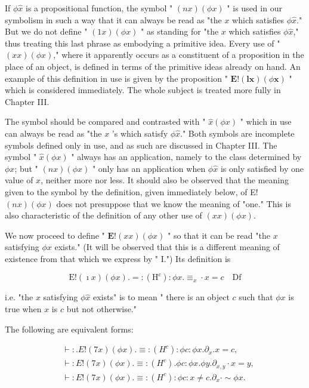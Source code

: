 \documentclass[10pt]{article}
\begin{document}
If $\phi \hat{x}$ is a propositional function, the symbol " $(n x)(\phi x)$ " is used in our symbolism in such a way that it can always be read as "the $x$ which satisfies $\phi \hat{x}$." But we do not define " $(1 x)(\phi x)$ " as standing for "the $x$ which satisfies $\phi \hat{x}$," thus treating this last phrase as embodying a primitive idea. Every use of " $(x x)(\phi x)$," where it apparently occurs as a constituent of a proposition in the place of an object, is defined in terms of the primitive ideas already on hand. An example of this definition in use is given by the proposition " $\mathbf{E}!(\boldsymbol{l} \boldsymbol{x})(\phi \boldsymbol{x})$ " which is considered immediately. The whole subject is treated more fully in Chapter III.

The symbol should be compared and contrasted with " $\hat{x}(\phi x)$ " which in use can always be read as "the $x$ 's which satisfy $\phi \hat{x}$." Both symbols are incomplete symbols defined only in use, and as such are discussed in Chapter III. The symbol " $\hat{x}(\phi x)$ " always has an application, namely to the class determined by $\phi x$; but " $(n x)(\phi x)$ " only has an application when $\phi \hat{x}$ is only satisfied by one value of $x$, neither more nor less. It should also be observed that the meaning given to the symbol by the definition, given immediately below, of E! $(n x)(\phi x)$ does not presuppose that we know the meaning of "one." This is also characteristic of the definition of any other use of $(x x)(\phi x)$.

We now proceed to define " $\mathbf{E}!(x x)(\phi x)$ " so that it can be read "the $x$ satisfying $\phi x$ exists." (It will be observed that this is a different meaning of existence from that which we express by " I.") Its definition is

$$
\mathrm{E}!(\imath x)(\phi x) .=:\left(\mathrm{H}^{c}\right): \phi x . \equiv_{x} \cdot x=c \quad \mathrm{Df}
$$

i.e. "the $x$ satisfying $\phi \hat{x}$ exists" is to mean " there is an object $c$ such that $\phi x$ is true when $x$ is $c$ but not otherwise."

The following are equivalent forms:

$$
\begin{aligned}
& \vdash: . E!(7 x)(\phi x) . \equiv:\left(H^{c}\right): \phi c: \phi x . \partial_{x} . x=c, \\
& \vdash: E!(7 x)(\phi x) . \equiv:\left(H^{c}\right) . \phi c: \phi x . \phi y . \partial_{x, y} \cdot x=y, \\
& \vdash: E!(7 x)(\phi x) . \equiv:\left(H^{c}\right): \phi c: x \neq c . \partial_{x} \cdot \sim \phi x .
\end{aligned}
$$
\end{document}
